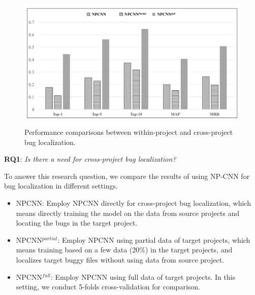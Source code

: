 \begin{table}[htbp]
  \label{tab:results1}%
\end{table}%


\begin{figure}[hbt]
\centering
\includegraphics[width = 0.9\columnwidth]{pic/results1_avg.pdf}
\caption{Performance comparisons between within-project and cross-project bug localization.}
\label{fig:results1}
\end{figure}


\textbf{RQ1}: \textit{Is there a need for cross-project bug localization?}

To answer this research question, we compare the results of using NP-CNN for bug localization in different settings.

\begin{itemize}
  \item NPCNN: Employ NPCNN directly for cross-project bug localization, which means directly training the model on the data from source projects and locating the bugs in the target project.
  \item NPCNN$^{partial}$: Employ NPCNN using partial data of target projects, which means training based on a few data (20\%) in the target projects, and localizes target buggy files without using data from source project.
  \item NPCNN$^{full}$: Employ NPCNN using full data of target projects. In this setting, we conduct 5-folds cross-validation for comparison.
\end{itemize}

